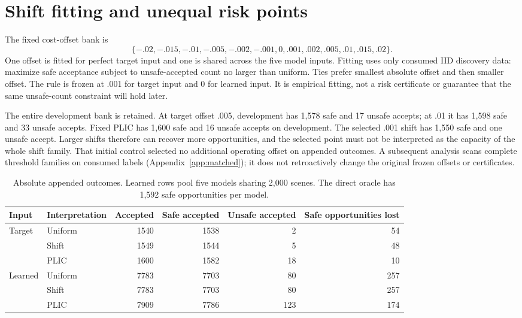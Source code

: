 \section{Shift fitting and unequal risk points}
\label{app:shift}
The fixed cost-offset bank is
\[
\{- .02,- .015,- .01,- .005,- .002,- .001,0,.001,.002,.005,.01,.015,.02\}.
\]
One offset is fitted for perfect target input and one is shared across the five
model inputs. Fitting uses only consumed IID discovery data: maximize safe
acceptance subject to unsafe-accepted count no larger than uniform. Ties prefer
smallest absolute offset and then smaller offset. The rule is frozen at .001
for target input and 0 for learned input. It is empirical fitting, not a risk
certificate or guarantee that the same unsafe-count constraint will hold later.

The entire development bank is retained. At target offset .005, development has
1,578 safe and 17 unsafe accepts; at .01 it has 1,598 safe and 33 unsafe accepts.
Fixed PLIC has 1,600 safe and 16 unsafe accepts on development. The selected .001
shift has 1,550 safe and one unsafe accept. Larger shifts therefore can recover
more opportunities, and the selected point must not be interpreted as the
capacity of the whole shift family. That initial control selected no additional
operating offset on appended outcomes. A subsequent analysis scans complete
threshold families on consumed labels (Appendix~\ref{app:matched}); it does not
retroactively change the original frozen offsets or certificates.

\begin{table}[h]
\centering\small
\caption{Absolute appended outcomes. Learned rows pool five models sharing
2,000 scenes. The direct oracle has 1,592 safe opportunities per model.}
\begin{tabular}{llrrrr}
\toprule
Input & Interpretation & Accepted & Safe accepted & Unsafe accepted & Safe opportunities lost\\
\midrule
Target & Uniform &1540&1538&2&54\\
 & Shift &1549&1544&5&48\\
 & PLIC &1600&1582&18&10\\
Learned & Uniform &7783&7703&80&257\\
 & Shift &7783&7703&80&257\\
 & PLIC &7909&7786&123&174\\
\bottomrule
\end{tabular}
\end{table}

